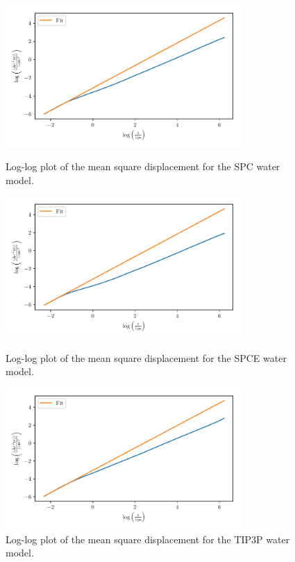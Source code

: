 \documentclass[a4paper,10pt,bibtotoc]{scrartcl}
\begin{document}
\begin{figure}[h]
\centering
 \includegraphics[width=0.8\textwidth]{MSD_SPC_LOG.pdf}
 \caption{Log-log plot of the mean square displacement for the SPC water model.}
 \label{fig:fig_gromacs_7}
 \includegraphics[width=0.8\textwidth]{MSD_SPCE_LOG.pdf}
 \caption{Log-log plot of the mean square displacement for the SPCE water model.}
 \label{fig:fig_gromacs_8}
 \includegraphics[width=0.8\textwidth]{MSD_TIP3P_LOG.pdf}
 \caption{Log-log plot of the mean square displacement for the TIP3P water model.}
 \label{fig:fig_gromacs_9}
\end{figure}
\end{document}
